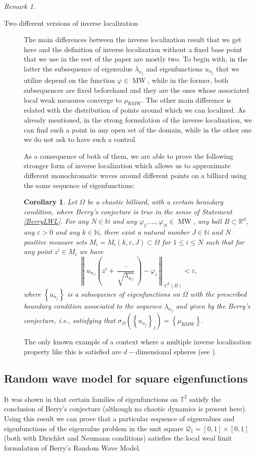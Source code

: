 \documentclass{amsart}
\newtheorem{corollary}[theorem]{Corollary}
\theoremstyle{definition}
\theoremstyle{remark}
\newtheorem{remark}[theorem]{Remark}
\newcommand{\ep}{\varepsilon}
\newcommand{\vp}{\varphi}
\newcommand{\Om}{\Omega}
\def\RR{\mathbb{R}}
\renewcommand\leq\leqslant
\numberwithin{equation}{section}
\theoremstyle{definition}
\theoremstyle{remark}
\def\RR{\mathbb{R}}
\DeclareMathOperator\MW{MW}
\newcommand\muRMW{\mu_{\mathrm{RMW}}}
\begin{document}
\begin{remark}
\begin{description}
		\item[Two different versions of inverse localization] The main differences between the inverse localization result that we get here and the definition of inverse localization without a fixed base point that we use in the rest of the paper are mostly two. To begin with, in the latter the subsequence of eigenvalue $\lambda_{n_j}$ and eigenfunctions $u_{n_j}$ that we utilize depend on the function $\varphi\in\MW$, while in the former, both subsequences are fixed beforehand and they are the ones whose associated local weak measures converge to $\muRMW$. The other main difference is related with the distribution of points around which we can localized. As already mentioned, in the strong formulation of the inverse localization, we can find such a point in any open set of the domain, while in the other one we do not ask to have such a control. 
        
        As a consequence of both of them, we are able to prove the following stronger form of inverse localization which allows us to approximate different monochromatic waves around different points on a billiard using the same sequence of eigenfunctions:\begin{corollary}
				Let $\Omega$ be a chaotic billiard, with a certain boundary condition, where Berry's conjecture is true in the sense of Statement \ref{BerryLWL}. For any $N\in\mathbb{N}$ and any $\vp_1,\ldots,\vp_N\in\MW$, any ball $B\subset\RR^d$, any $\ep>0$ and any $k\in\mathbb{N}$, there exist a natural number $J\in\mathbb{N}$ and $N$ positive measure sets $M_i=M_i(k,\ep,J)\subset \Om$ for $1\leq i\leq N$ such that for any point $z^i\in M_i$ we have \begin{equation}
				\left\|u_{n_J}\left(z^i+\frac{\cdot}{\sqrt{\lambda_{n_J}}}\right)-\vp_i\right\|_{C^k(B)}<\ep,
			\end{equation}where $\left\{u_{n_j}\right\}$ is a subsequence of eigenfunctions on $\Om$ with the prescribed boundary condition associated to the sequence $\lambda_{n_j}$ and given by the Berry's conjecture, i.e., satisfying that $	\sigma_\Omega\left(\left\{u_{n_j}\right\}_j\right)=\left\{\muRMW\right\}.$
		\end{corollary}
		The only known example of a context where a multiple inverse localization property like this is satisfied are $d-$dimensional spheres (see \cite[Section 5]{EPT21}).
	\end{description}
\end{remark}
\subsection{Random wave model for square eigenfunctions}\label{app.3}
  It was shown in \cite{Ingremeau} that certain families of eigenfunctions
  on $\mathbb{T}^2$ satisfy the conclusion of Berry’s conjecture (although no chaotic dynamics is present here). Using this result we can prove that a particular sequence of eigenvalues and eigenfunctions of the eigenvalue problem in the unit square $\mathcal{Q}_1=[0,1]\times[0,1]$ (both with Dirichlet and Neumann conditions) satisfies the local weal limit formulation of Berry's Random Wave Model. 
\end{document}
